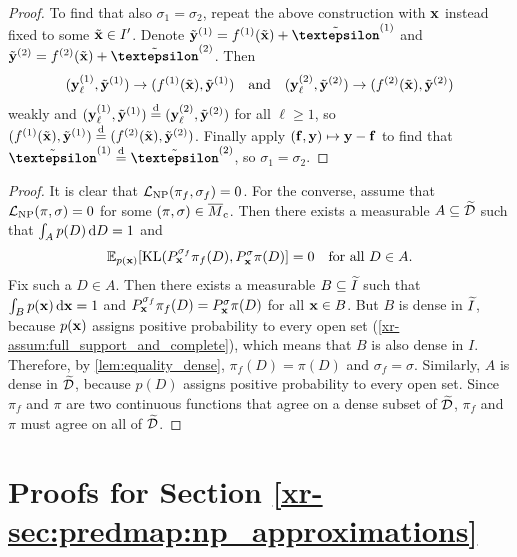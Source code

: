 \documentclass[12pt, twoside]{report}
\newcommand{\xrprefix}[1]{xr-#1}
\begin{document}
\begin{proof}
    To find that also $\sigma_1 = \sigma_2$, repeat the above construction with $\mathbf{x}$ instead fixed to some $\tilde{\mathbf{x}} \in I'$.
    Denote $\tilde\vy\us{(1)} = f\us{(1)}(\tilde\vx) + \tilde\vep\us{(1)}$
    and $\tilde\vy\us{(2)} = f\us{(2)}(\tilde\vx) + \tilde\vep\us{(2)}$.
    Then
    \begin{equation}
        (\vy_\ell\us{(1)}, {\tilde\vy}\us{(1)})
        \to (f\us{(1)}(\tilde\vx), {\tilde\vy}\us{(1)})
        \quad\text{and}\quad
        (\vy_\ell\us{(2)}, \tilde\vy\us{(2)})
        \to (f\us{(2)}(\tilde\vx), {\tilde\vy}\us{(2)})
    \end{equation}
    weakly
    and $(\vy_\ell\us{(1)}, \tilde\vy\us{(1)}) \disteq (\vy_\ell\us{(2)}, \tilde\vy\us{(2)})$ for all $\ell \ge 1$,
    so $(f\us{(1)}(\tilde\vx), \tilde\vy\us{(1)}) \disteq (f\us{(2)}(\tilde\vx), \tilde\vy\us{(2)})$.
    Finally apply $(\mathbf{f}, \mathbf{y}) \mapsto \mathbf{y} - \mathbf{f}$ to find that $\tilde\vep\us{(1)} \disteq \tilde\vep\us{(2)}$, so $\sigma_1 = \sigma_2$.
\end{proof}

\begin{proof}
    It is clear that $\L\ss{NP}(\pi_f, \sigma_f) = 0$.
    For the converse, assume that $\L\ss{NP}(\pi, \sigma) = 0$ for some $(\pi, \sigma) \in \overline{M}\ss{c}$.
    Then there exists a measurable $A \subseteq \widetilde{\mathcal{D}}$ such that $\int_A p(D) \, \mathrm{d} D = 1$ and 
    \begin{equation}
        \mathbb{E}_{p(\mathbf{x})}[\operatorname{KL}(P^{\sigma_f}_{\mathbf{x}} \pi_f(D), P^{\sigma}_{\mathbf{x}} \pi(D)] = 0
        \quad\text{for all $D \in A$}.
    \end{equation}
    Fix such a $D \in A$.
    Then there exists a measurable $B \subseteq \widetilde{I}$ such that $\int_{B} p(\mathbf{x}) \, \mathrm{d} \mathbf{x} = 1$ and $P^{\sigma_f}_{\mathbf{x}} \pi_f(D)= P^\sigma_{\mathbf{x}} \pi(D)$ for all $\mathbf{x} \in B$.
    But $B$ is dense in $\widetilde{I}$, because $p(\mathbf{x})$ assigns positive probability to every open set (\cref{\xrprefix{assum:full_support_and_complete}}), which means that $B$ is also dense in $I$.
    Therefore, by \cref{lem:equality_dense}, $\pi_f(D) = \pi(D)$ and $\sigma_f = \sigma$.
    Similarly, $A$ is dense in $\widetilde{\mathcal{D}}$, because $p(D)$ assigns positive probability to every open set.
    Since $\pi_f$ and $\pi$ are two continuous functions that agree on a dense subset of $\widetilde{\mathcal{D}}$, $\pi_f$ and $\pi$ must agree on all of $\widetilde{\mathcal{D}}$.
\end{proof}

\section{Proofs for Section \ref{\xrprefix{sec:predmap:np_approximations}}}
\label{sec:proofs_predmap:np_approximations}
\end{document}
